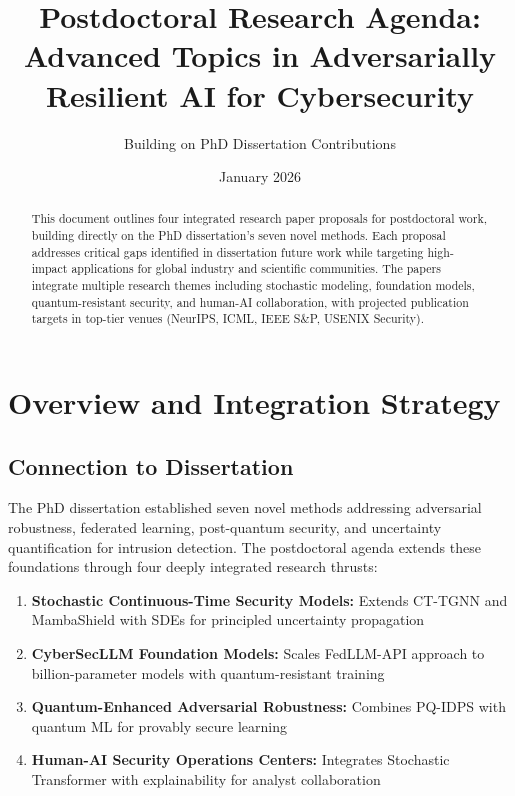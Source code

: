 \documentclass[11pt,letterpaper]{article}
\title{\textbf{Postdoctoral Research Agenda:}\\
Advanced Topics in Adversarially Resilient AI for Cybersecurity}
\author{Building on PhD Dissertation Contributions}
\date{January 2026}
\begin{document}
\maketitle

\begin{abstract}
This document outlines four integrated research paper proposals for postdoctoral work, building directly on the PhD dissertation's seven novel methods. Each proposal addresses critical gaps identified in dissertation future work while targeting high-impact applications for global industry and scientific communities. The papers integrate multiple research themes including stochastic modeling, foundation models, quantum-resistant security, and human-AI collaboration, with projected publication targets in top-tier venues (NeurIPS, ICML, IEEE S\&P, USENIX Security).
\end{abstract}

\tableofcontents
\newpage

\section{Overview and Integration Strategy}

\subsection{Connection to Dissertation}

The PhD dissertation established seven novel methods addressing adversarial robustness, federated learning, post-quantum security, and uncertainty quantification for intrusion detection. The postdoctoral agenda extends these foundations through four deeply integrated research thrusts:

\begin{enumerate}[leftmargin=2em]
\item \textbf{Stochastic Continuous-Time Security Models:} Extends CT-TGNN and MambaShield with SDEs for principled uncertainty propagation
\item \textbf{CyberSecLLM Foundation Models:} Scales FedLLM-API approach to billion-parameter models with quantum-resistant training
\item \textbf{Quantum-Enhanced Adversarial Robustness:} Combines PQ-IDPS with quantum ML for provably secure learning
\item \textbf{Human-AI Security Operations Centers:} Integrates Stochastic Transformer with explainability for analyst collaboration
\end{enumerate}
\end{document}
